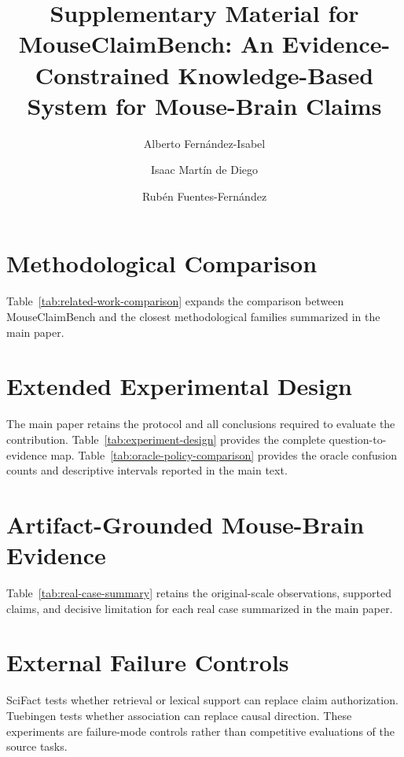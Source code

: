 \documentclass[preprint,12pt]{elsarticle}
\begin{document}
\begin{frontmatter}
\title{Supplementary Material for MouseClaimBench: An Evidence-Constrained Knowledge-Based System for Mouse-Brain Claims}
\author[urjc]{Alberto Fern\'andez-Isabel}
\author[urjc]{Isaac Mart\'in de Diego}
\author[ucm]{Rub\'en Fuentes-Fern\'andez}
\end{frontmatter}
\clearpage

\section{Methodological Comparison}

Table~\ref{tab:related-work-comparison} expands the comparison between MouseClaimBench and the closest methodological families summarized in the main paper.



\section{Extended Experimental Design}

The main paper retains the protocol and all conclusions required to evaluate the contribution. Table~\ref{tab:experiment-design} provides the complete question-to-evidence map. Table~\ref{tab:oracle-policy-comparison} provides the oracle confusion counts and descriptive intervals reported in the main text.




\section{Artifact-Grounded Mouse-Brain Evidence}

Table~\ref{tab:real-case-summary} retains the original-scale observations, supported claims, and decisive limitation for each real case summarized in the main paper.



\section{External Failure Controls}

SciFact tests whether retrieval or lexical support can replace claim authorization. Tuebingen tests whether association can replace causal direction. These experiments are failure-mode controls rather than competitive evaluations of the source tasks.
\end{document}
